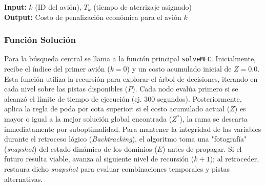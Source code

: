 \documentclass[12pt]{article}
\begin{document}
\begin{algorithm}[H]
\vspace{2mm}
\textbf{Input:} $k$ (ID del avión), $T_k$ (tiempo de aterrizaje asignado)\;\\
\textbf{Output:} Costo de penalización económica para el avión $k$\;
\BlankLine
{}
\vspace{2mm}
\caption{calcularCosto}
\end{algorithm}

\subsubsection{Función Solución}

Para la búsqueda central se llama a la función principal \texttt{solveMFC}. Inicialmente, recibe el índice del primer avión ($k=0$) y un costo acumulado inicial de $Z=0.0$. Esta función utiliza la recursión para explorar el árbol de decisiones, iterando en cada nivel sobre las pistas disponibles ($P$). Cada nodo evalúa primero si se alcanzó el límite de tiempo de ejecución (ej. 300 segundos). Posteriormente, aplica la regla de poda por cota superior: si el costo acumulado actual ($Z$) es mayor o igual a la mejor solución global encontrada ($Z^*$), la rama se descarta inmediatamente por suboptimalidad. Para mantener la integridad de las variables durante el retroceso lógico (\textit{Backtracking}), el algoritmo toma una "fotografía" (\textit{snapshot}) del estado dinámico de los dominios ($E$) antes de propagar. Si el futuro resulta viable, avanza al siguiente nivel de recursión ($k+1$); al retroceder, restaura dicho \textit{snapshot} para evaluar combinaciones temporales y pistas alternativas.
\end{document}
